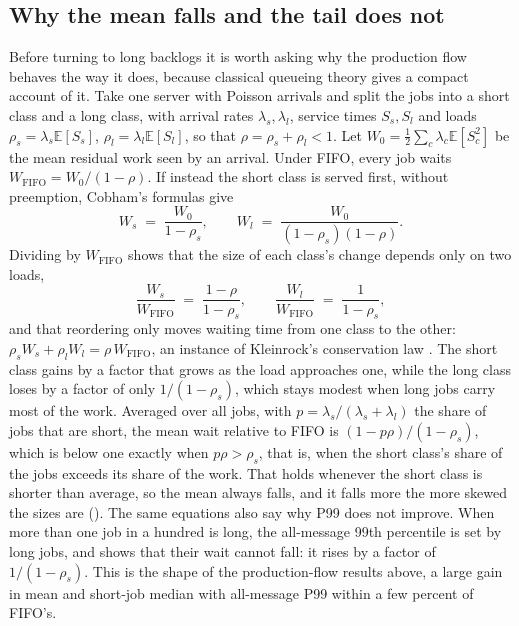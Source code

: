 \subsection{Why the mean falls and the tail does not}\label{sec:analysis}

Before turning to long backlogs it is worth asking why the production flow behaves the way it does, because classical queueing
theory gives a compact account of it. Take one server with Poisson arrivals and split the jobs into a short class and a long
class, with arrival rates $\lambda_s,\lambda_l$, service times $S_s,S_l$ and loads $\rho_s=\lambda_s\mathbb{E}[S_s]$,
$\rho_l=\lambda_l\mathbb{E}[S_l]$, so that $\rho=\rho_s+\rho_l<1$. Let $W_0=\tfrac12\sum_{c}\lambda_c\mathbb{E}[S_c^2]$ be the mean residual work
seen by an arrival. Under FIFO, every job waits $W_{\text{FIFO}}=W_0/(1-\rho)$. If instead the short class is served first, without
preemption, Cobham's formulas \citep{cobham1954} give
\begin{equation}
  W_s \;=\; \frac{W_0}{1-\rho_s},
  \qquad
  W_l \;=\; \frac{W_0}{(1-\rho_s)(1-\rho)} .
  \label{eq:cobham}
\end{equation}
Dividing by $W_{\text{FIFO}}$ shows that the size of each class's change depends only on two loads,
\begin{equation}
  \frac{W_s}{W_{\text{FIFO}}} \;=\; \frac{1-\rho}{1-\rho_s},
  \qquad
  \frac{W_l}{W_{\text{FIFO}}} \;=\; \frac{1}{1-\rho_s},
  \label{eq:ratios}
\end{equation}
and that reordering only moves waiting time from one class to the other: $\rho_s W_s+\rho_l W_l=\rho\,W_{\text{FIFO}}$, an instance of
Kleinrock's conservation law \citep{kleinrock1965}. The short class gains by a factor that grows as the load approaches one, while the long
class loses by a factor of only $1/(1-\rho_s)$, which stays modest when long jobs carry most of the work. Averaged over all jobs, with $p=\lambda_s/(\lambda_s+\lambda_l)$
the share of jobs that are short, the mean wait relative to FIFO is $(1-p\rho)/(1-\rho_s)$, which is below one exactly when $p\rho>\rho_s$, that is, when the short class's
share of the jobs exceeds its share of the work. That holds whenever the short class is shorter than average, so the mean always falls, and it falls more the more skewed the sizes are
(). The same equations also say why P99 does not improve. When more than one job in a hundred is long, the all-message
99th percentile is set by long jobs, and  shows that their wait cannot fall: it rises by a factor of $1/(1-\rho_s)$. This is the shape of the production-flow results
above, a large gain in mean and short-job median with all-message P99 within a few percent of FIFO's.

